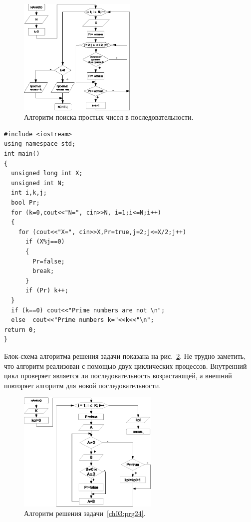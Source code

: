 \begin{figure}[htb]
\begin{center}
\includegraphics[width=0.5\textwidth]{img/ris_3_37}
\caption{Алгоритм поиска простых чисел в последовательности.}
\label{ch03:refDrawing36}
\end{center}
\end{figure}

\begin{lstlisting}
#include <iostream>
using namespace std;
int main()
{
  unsigned long int X; 
  unsigned int N; 
  int i,k,j;
  bool Pr;
  for (k=0,cout<<"N=", cin>>N, i=1;i<=N;i++)
  {
    for (cout<<"X=", cin>>X,Pr=true,j=2;j<=X/2;j++)
      if (X%j==0) 
      {
        Pr=false;
        break;
      }
      if (Pr) k++;
  }
  if (k==0) cout<<"Prime numbers are not \n";
  else  cout<<"Prime numbers k="<<k<<"\n";
return 0;
}
\end{lstlisting}


Блок-схема алгоритма решения задачи показана на рис.~\ref{ch03:refDrawing37}. Не трудно заметить, что алгоритм реализован с
помощью двух циклических процессов. Внутренний цикл проверяет является ли последовательность возрастающей, а внешний
повторяет алгоритм для новой последовательности.

\begin{figure}[htb]
\begin{center}
\includegraphics[width=0.6\textwidth]{img/ris_3_38}
\caption{Алгоритм решения задачи~\ref{ch03:prg24}.}
\label{ch03:refDrawing37}
\end{center}
\end{figure}

